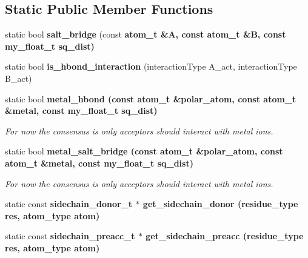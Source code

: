 \subsection*{Static Public Member Functions}
\begin{CompactItemize}
\item 
static bool \textbf{salt\_\-bridge} (const \bf{atom\_\-t} \&A, const \bf{atom\_\-t} \&B, const my\_\-float\_\-t sq\_\-dist)\label{classASCbase_1_1HbondGeometry_044cc1432011996eb5e9a27dd32874c9}

\item 
static bool \textbf{is\_\-hbond\_\-interaction} (interaction\-Type A\_\-act, interaction\-Type B\_\-act)\label{classASCbase_1_1HbondGeometry_c646aad45502f9c3f837cdf91700072a}

\item 
static bool \bf{metal\_\-hbond} (const \bf{atom\_\-t} \&polar\_\-atom, const \bf{atom\_\-t} \&metal, const my\_\-float\_\-t sq\_\-dist)\label{classASCbase_1_1HbondGeometry_40113626b71155acaeff6f20f4ff18b0}

\begin{CompactList}\small\item\em For now the consensus is only acceptors should interact with metal ions. \item\end{CompactList}\item 
static bool \bf{metal\_\-salt\_\-bridge} (const \bf{atom\_\-t} \&polar\_\-atom, const \bf{atom\_\-t} \&metal, const my\_\-float\_\-t sq\_\-dist)\label{classASCbase_1_1HbondGeometry_e35f9ba1e79c9ef6ec2595c6c5089214}

\begin{CompactList}\small\item\em For now the consensus is only acceptors should interact with metal ions. \item\end{CompactList}\item 
static const \bf{sidechain\_\-donor\_\-t} $\ast$ \textbf{get\_\-sidechain\_\-donor} (residue\_\-type res, atom\_\-type atom)\label{classASCbase_1_1HbondGeometry_744683e67955b2811701f4ac3c799545}

\item 
static const \bf{sidechain\_\-preacc\_\-t} $\ast$ \textbf{get\_\-sidechain\_\-preacc} (residue\_\-type res, atom\_\-type atom)\label{classASCbase_1_1HbondGeometry_73ea3b6706d0eea3353c6fe286f2239b}

\end{CompactItemize}
